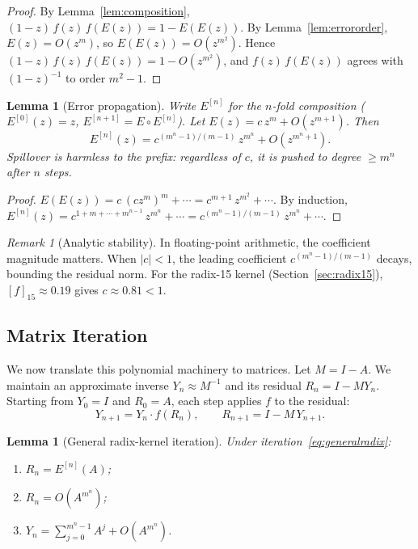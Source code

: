 \documentclass[
  journal=largetwo,
  manuscript=article,
  manuscriptlabel={Research Preprint},
  logo=false,
  simfonts=false,
  year=2026,
  volume=1,
]{cup-journal}
\newtheorem{lemma}[theorem]{Lemma}
\theoremstyle{definition}
\theoremstyle{remark}
\newtheorem{remark}[theorem]{Remark}
\begin{document}
\begin{proof}
  By Lemma~\ref{lem:composition},
  $(1-z)\,f(z)\,f(E(z)) = 1 - E(E(z))$.
  By Lemma~\ref{lem:errororder}, $E(z) = O(z^m)$, so
  $E(E(z)) = O(z^{m^2})$.
  Hence $(1-z)\,f(z)\,f(E(z)) = 1 - O(z^{m^2})$, and
  $f(z)\,f(E(z))$ agrees with $(1-z)^{-1}$ to order $m^2 - 1$.
\end{proof}

\begin{lemma}[Error propagation]
  \label{lem:errorprop}
  Write $E^{[n]}$ for the $n$-fold composition
  ($E^{[0]}(z) = z$, $E^{[n+1]} = E \circ E^{[n]}$).
  Let $E(z) = c\,z^m + O(z^{m+1})$. Then
  \[
    E^{[n]}(z) = c^{(m^n - 1)/(m-1)}\,z^{m^n} + O(z^{m^n+1}).
  \]
  Spillover is harmless to the prefix: regardless of $c$, it is
  pushed to degree $\geq m^n$ after $n$ steps.
\end{lemma}

\begin{proof}
  $E(E(z)) = c\,(cz^m)^m + \cdots = c^{m+1}\,z^{m^2} + \cdots$.
  By induction, $E^{[n]}(z) =
  c^{1+m+\cdots+m^{n-1}}\,z^{m^n} + \cdots = c^{(m^n-1)/(m-1)}\,z^{m^n}
  + \cdots$.
\end{proof}

\begin{remark}[Analytic stability]
  \label{rem:stability}
  In floating-point arithmetic, the coefficient magnitude matters.
  When $|c| < 1$, the leading coefficient $c^{(m^n-1)/(m-1)}$ decays,
  bounding the residual norm.
  For the radix-15 kernel (Section~\ref{sec:radix15}),
  $[f]_{15} \approx 0.19$ gives $c \approx 0.81 < 1$.
\end{remark}

\subsection{Matrix Iteration}

We now translate this polynomial machinery to matrices.
Let $M = I - A$. We maintain an approximate inverse
$Y_n \approx M^{-1}$ and its residual $R_n = I - MY_n$.
Starting from $Y_0 = I$ and $R_0 = A$, each step applies $f$
to the residual:
\begin{equation}
  \label{eq:generalradix}
  Y_{n+1} = Y_n \cdot f(R_n), \qquad R_{n+1} = I - M\,Y_{n+1}.
\end{equation}

\begin{lemma}[General radix-kernel iteration]
  \label{lem:generaliter}
  Under iteration~\eqref{eq:generalradix}:
  \begin{enumerate}
    \item $R_n = E^{[n]}(A)$;
    \item $R_n = O(A^{m^n})$;
    \item $Y_n = \sum_{j=0}^{m^n - 1} A^j + O(A^{m^n})$.
  \end{enumerate}
\end{lemma}
\end{document}
